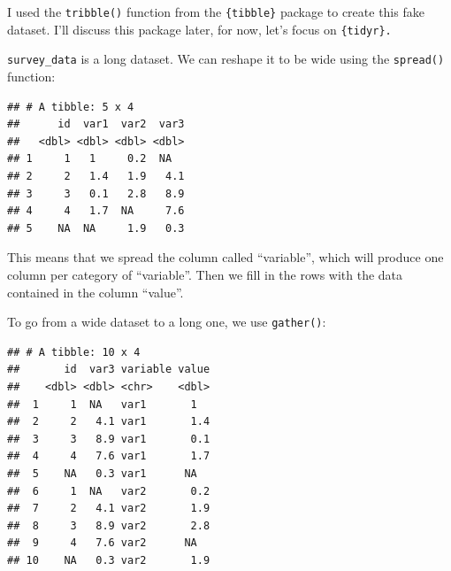 \documentclass[]{gitbook}
\newenvironment{Shaded}{\begin{snugshade}}{\end{snugshade}}
\newcommand{\KeywordTok}[1]{\textcolor[rgb]{0.13,0.29,0.53}{\textbf{#1}}}
\newcommand{\NormalTok}[1]{#1}
\newcommand{\OperatorTok}[1]{\textcolor[rgb]{0.81,0.36,0.00}{\textbf{#1}}}
\newcommand{\StringTok}[1]{\textcolor[rgb]{0.31,0.60,0.02}{#1}}
\theoremstyle{definition}
\theoremstyle{definition}
\theoremstyle{definition}
\theoremstyle{remark}
\begin{document}
I used the \texttt{tribble()} function from the \texttt{\{tibble\}}
package to create this fake dataset. I'll discuss this package later,
for now, let's focus on \texttt{\{tidyr\}.}

\texttt{survey\_data} is a long dataset. We can reshape it to be wide
using the \texttt{spread()} function:

\begin{Shaded}
\end{Shaded}

\begin{verbatim}
## # A tibble: 5 x 4
##      id  var1  var2  var3
##   <dbl> <dbl> <dbl> <dbl>
## 1     1   1     0.2  NA  
## 2     2   1.4   1.9   4.1
## 3     3   0.1   2.8   8.9
## 4     4   1.7  NA     7.6
## 5    NA  NA     1.9   0.3
\end{verbatim}

This means that we spread the column called ``variable'', which will
produce one column per category of ``variable''. Then we fill in the
rows with the data contained in the column ``value''.

To go from a wide dataset to a long one, we use \texttt{gather()}:

\begin{Shaded}
\end{Shaded}

\begin{verbatim}
## # A tibble: 10 x 4
##       id  var3 variable value
##    <dbl> <dbl> <chr>    <dbl>
##  1     1  NA   var1       1  
##  2     2   4.1 var1       1.4
##  3     3   8.9 var1       0.1
##  4     4   7.6 var1       1.7
##  5    NA   0.3 var1      NA  
##  6     1  NA   var2       0.2
##  7     2   4.1 var2       1.9
##  8     3   8.9 var2       2.8
##  9     4   7.6 var2      NA  
## 10    NA   0.3 var2       1.9
\end{verbatim}
\end{document}

